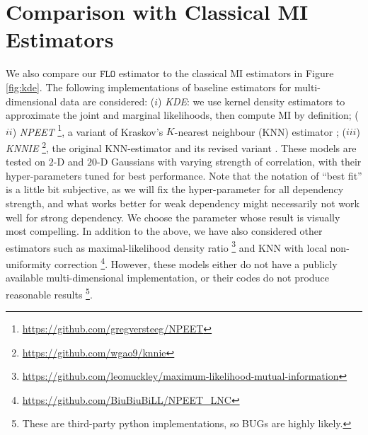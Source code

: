 \documentclass{article}
\theoremstyle{plain}
\theoremstyle{definition}
\theoremstyle{remark}
\newcommand{\FLO}{\texttt{FLO}}
\begin{document}
			\section{Comparison with Classical MI Estimators}
			
			
			
			We also compare our $\FLO$ estimator to the classical MI estimators in Figure \ref{fig:kde}. The following implementations of baseline estimators for multi-dimensional data are considered: ($i$) {\it KDE}: we use kernel density estimators to approximate the joint and marginal likelihoods, then compute MI by definition; ($ii$) {\it NPEET} \footnote{\url{https://github.com/gregversteeg/NPEET}}, a variant of Kraskov's $K$-nearest neighbour (KNN) estimator \citep{kraskov2004estimating, ver2013information}; ($iii$) {\it KNNIE} \footnote{\url{https://github.com/wgao9/knnie}}, the original KNN-estimator and its revised variant \cite{gao2018demystifying}. These models are tested on $2$-D and $20$-D Gaussians with varying strength of correlation, with their hyper-parameters tuned for best performance. Note that the notation of ``best fit'' is a little bit subjective, as we will fix the hyper-parameter for all dependency strength, and what works better for weak dependency might necessarily not work well for strong dependency. We choose the parameter whose result is visually most compelling. In addition to the above, we have also considered other estimators such as maximal-likelihood density ratio \footnote{\url{https://github.com/leomuckley/maximum-likelihood-mutual-information}} \citep{suzuki2008approximating} and KNN with local non-uniformity correction \footnote{\url{https://github.com/BiuBiuBiLL/NPEET_LNC}}. However, these models either do not have a publicly available multi-dimensional implementation, or their codes do not produce reasonable results \footnote{These are third-party python implementations, so BUGs are highly likely.}.
			
			
			
			
\end{document}

